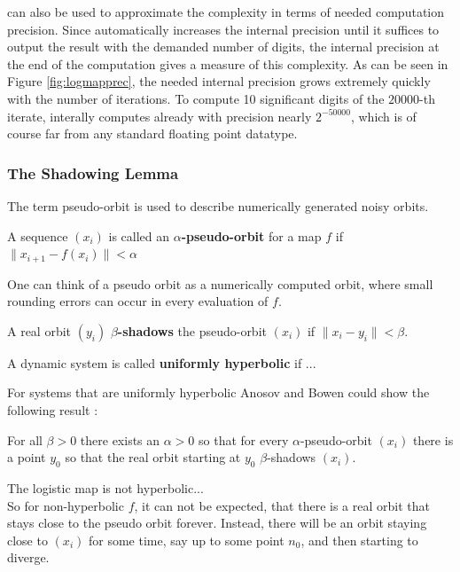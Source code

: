   \irram can also be used to approximate the complexity in terms of needed computation precision. Since \irram automatically increases the internal precision until it suffices to output the result with the demanded number of digits, the internal precision at the end of the computation gives a measure of this complexity. As can be seen in Figure \ref{fig:logmapprec}, the needed internal precision grows extremely quickly with the number of iterations.
  To compute 10 significant digits of the $20000$-th iterate, \irram interally computes already with precision nearly $2^{-50000}$, which is of course far from any standard floating point datatype.   
  \subsubsection{The Shadowing Lemma}
    The term pseudo-orbit is used to describe numerically generated noisy orbits. 
    \begin{definition}\label{def:pseudoorbit}
      A sequence $(x_i)$ is called an \textbf{$\alpha$-pseudo-orbit} for a map $f$ if
      $ \| x_{i+1} - f(x_i) \| < \alpha $  
    \end{definition}
    One can think of a pseudo orbit as a numerically computed orbit, where small rounding errors can occur in every evaluation of $f$.
    \begin{definition}\label{def:shadowing}
      A real orbit $(y_i)$ \textbf{$\beta$-shadows} the pseudo-orbit $(x_i)$ if 
      $\| x_i - y_i \| < \beta$.  
    \end{definition}
    \begin{definition}
      A dynamic system is called \textbf{uniformly hyperbolic} if ...
    \end{definition}
    For systems that are uniformly hyperbolic Anosov and Bowen could show the following result \cite{anosov1967} \cite{Bowen1975} \cite{Hasselblatt:2008}:
    \begin{theorem}
     For all $\beta > 0$ there exists an $\alpha > 0$ so that for every $\alpha$-pseudo-orbit $(x_i)$ there is a point $y_0$ so that the real orbit starting at $y_0$ $\beta$-shadows $(x_i)$.
    \end{theorem} 
    The logistic map is not hyperbolic...\\
    So for non-hyperbolic $f$, it can not be expected, that there is a real orbit that stays close to the pseudo orbit forever.
    Instead, there will be an orbit staying close to $(x_i)$ for some time, say up to some point $n_0$, and then starting to diverge. 
